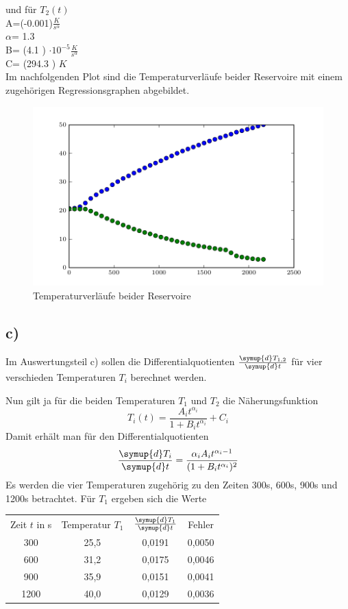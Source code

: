 und für $T_2(t)$\\

A=(-0.001)$\frac{K}{s^\alpha}$ \\
$\alpha$= 1.3  \\
B= (4.1 ) $\cdot 10^{-5}\frac{K}{s^\alpha}$\\
C= (294.3 ) $K$ \\

Im nachfolgenden Plot sind die Temperaturverläufe beider Reservoire mit einem zugehörigen Regressionsgraphen abgebildet.

\begin{figure}
  \centering
  \includegraphics{build/plot.pdf}
  \caption{Temperaturverläufe beider Reservoire}
  \label{fig:temperaturverlauf}
\end{figure}


\subsection{c)}
Im Auswertungsteil c) sollen die Differentialquotienten $\frac{\symup{d}T_{1,2}}{\symup{d}t}$
für vier verschieden Temperaturen $T_i$ berechnet werden.

Nun gilt ja für die beiden Temperaturen $T_1$ und $T_2$ die Näherungsfunktion
\begin{equation}
	T_i(t) = \frac{A_i t^{\alpha_i}}{1 + B_i t^{\alpha_i}} + C_i
\end{equation}
Damit erhält man für den Differentialquotienten
\begin{equation}
	\frac{\symup{d}T_i}{\symup{d}t} = \frac{\alpha_i A_i t^{\alpha_i - 1}}{(1 + B_i t^{\alpha_i})^2}
\end{equation}
Es werden die vier Temperaturen zugehörig zu den Zeiten 300s, 600s, 900s und 1200s betrachtet.
Für $T_1$ ergeben sich die Werte
\begin{table}
\begin{tabular}{cccc}
	Zeit $t$ in s & Temperatur $T_1$ & $\frac{\symup{d}T_1}{\symup{d}t}$ & Fehler \\
	300 & 25,5 & 0,0191 & 0,0050 \\
	600 & 31,2 & 0,0175 & 0,0046 \\
	900 & 35,9 & 0,0151 & 0,0041 \\
	1200 & 40,0 & 0,0129 & 0,0036 \\
\end{tabular}
\end{table}

